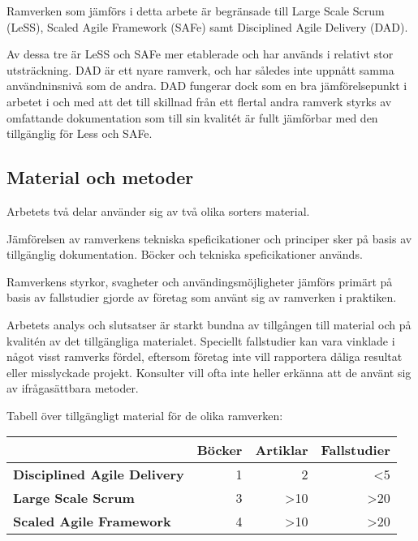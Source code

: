 	Ramverken som jämförs i detta arbete är begränsade till Large Scale Scrum (LeSS), Scaled Agile Framework (SAFe) samt Disciplined Agile Delivery (DAD).
	
	Av dessa tre är LeSS och SAFe mer etablerade och har används i relativt stor utsträckning. DAD är ett nyare ramverk, och har således inte uppnått samma användninsnivå som de andra. DAD fungerar dock som en bra jämförelsepunkt i arbetet i och med att det till skillnad från ett flertal andra ramverk styrks av omfattande dokumentation som till sin kvalitét är fullt jämförbar med den tillgänglig för Less och SAFe. \cite{ask_matrix}
	
	
	\subsection{Material och metoder}
	Arbetets två delar använder sig av två olika sorters material.
	
	Jämförelsen av ramverkens tekniska speficikationer och principer sker på basis av tillgänglig dokumentation. Böcker och tekniska speficikationer används.
	\linebreak
	
	Ramverkens styrkor, svagheter och användingsmöjligheter jämförs primärt på basis av fallstudier gjorde av företag som använt sig av ramverken i praktiken.
	
	
	
	Arbetets analys och slutsatser är starkt bundna av tillgången till material och på kvalitén av det tillgängliga materialet. Speciellt fallstudier kan vara vinklade i något visst ramverks fördel, eftersom företag inte vill rapportera dåliga resultat eller misslyckade projekt. Konsulter vill ofta inte heller erkänna att de använt sig av ifrågasättbara metoder.
	
	
	Tabell över tillgängligt material för de olika ramverken:

	\begin{center}
	\begin{tabular}{ >{\bfseries}l | r | r | r }
		 	 						& Böcker & Artiklar & Fallstudier 	\\ \hline
		Disciplined Agile Delivery 	& 1 	& 2			& <5 			\\ \hline
		Large Scale Scrum 			& 3 	& >10		& >20 			\\ \hline
		Scaled Agile Framework 		& 4 	& >10		& >20 			\\ 
	\end{tabular}
	\end{center}
	
